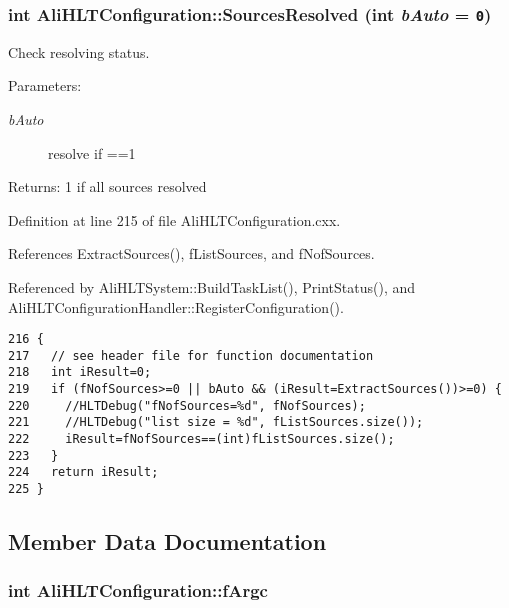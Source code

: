 \subsubsection{\setlength{\rightskip}{0pt plus 5cm}int Ali\-HLTConfiguration::Sources\-Resolved (int {\em b\-Auto} = {\tt 0})}\label{classAliHLTConfiguration_a11}


Check resolving status. \begin{Desc}
\item[Parameters:]
\begin{description}
\item[{\em b\-Auto}]resolve if ==1 \end{description}
\end{Desc}
\begin{Desc}
\item[Returns:]1 if all sources resolved \end{Desc}


Definition at line 215 of file Ali\-HLTConfiguration.cxx.

References Extract\-Sources(), f\-List\-Sources, and f\-Nof\-Sources.

Referenced by Ali\-HLTSystem::Build\-Task\-List(), Print\-Status(), and Ali\-HLTConfiguration\-Handler::Register\-Configuration().

\footnotesize\begin{verbatim}216 {
217   // see header file for function documentation
218   int iResult=0;
219   if (fNofSources>=0 || bAuto && (iResult=ExtractSources())>=0) {
220     //HLTDebug("fNofSources=%d", fNofSources);
221     //HLTDebug("list size = %d", fListSources.size());
222     iResult=fNofSources==(int)fListSources.size();
223   }
224   return iResult;
225 }
\end{verbatim}\normalsize 




\subsection{Member Data Documentation}
\subsubsection{\setlength{\rightskip}{0pt plus 5cm}int {\bf Ali\-HLTConfiguration::f\-Argc}\hspace{0.3cm}{\tt  [private]}}\label{classAliHLTConfiguration_r7}


